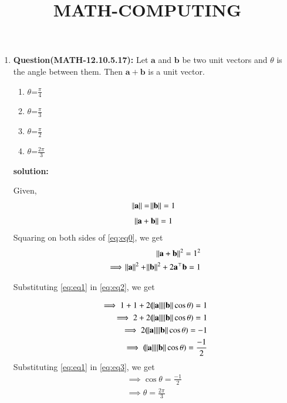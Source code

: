 \documentclass[12pt,-letter paper]{article}
\let\vec\mathbf{}
\let\vec\mathbf{}
\let\vec\mathbf{}
\begin{document}
\title{\textbf{MATH-COMPUTING}}
\maketitle
\begin{enumerate}
 
    \item \textbf{Question(MATH-12.10.5.17):}
       Let $\vec{a}$ and $\vec{b}$ be two unit vectors and $\theta$ is the angle between them. Then $\vec{a}+\vec{b}$ is a unit vector.
    
 \begin{enumerate}[label=(\Alph*)]                     
 \item $\theta$=$\frac{\pi}{4}$
 \item $\theta$=$\frac{\pi}{3}$
  \item $\theta$=$\frac{\pi}{2}$
   \item $\theta$=$\frac{2\pi}{3}$
   \end{enumerate}

 \textbf{solution:}

Given,
\begin{align}
	\norm{\vec{a}} = \norm{\vec{b}}=1 
 \label{eq:eq1}
  \end{align}
 \begin{align}
	\norm{\vec{a}+\vec{b}}=1
 \label{eq:eq0}
 \end{align}
Squaring on both sides of \eqref{eq:eq0}, we get
\begin{align}
	\norm{\vec{a}+\vec{b}}^2=1^2
\\	
	\implies \norm{\vec{a}}^2 + \norm{\vec{b}}^2 + 2\vec{a}^{\top}\vec{b} = 1
 \label{eq:eq2}
\end{align}

Substituting \eqref{eq:eq1} in \eqref{eq:eq2}, we get

\begin{align}
	\implies 1+1+2(\norm{\vec{a}}\norm{\vec{b}}\cos{\theta})=1
	\\
	\implies 2+2(\norm{\vec{a}}\norm{\vec{b}}\cos{\theta})=1
        \\
	\implies 2(\norm{\vec{a}}\norm{\vec{b}}\cos{\theta})=-1
	\\
	\implies (\norm{\vec{a}}\norm{\vec{b}}\cos{\theta})=\frac{-1}{2}
 \label{eq:eq3}
\end{align}
Substituting \eqref{eq:eq1} in \eqref{eq:eq3}, we get
\begin{align}
	\implies \cos{\theta}=\frac{-1}{2}
	\\
	\implies \theta=\frac{2\pi}{3}
\end{align}


\end{enumerate}
\end{document}
